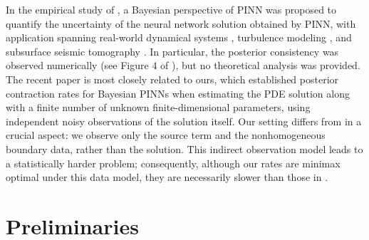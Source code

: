 \documentclass{article}
\theoremstyle{plain}
\theoremstyle{definition}
\theoremstyle{remark}
\begin{document}
In the empirical study of \cite{yang2021b}, a Bayesian perspective of PINN was proposed to quantify the uncertainty of the neural network solution obtained by PINN, with application spanning real-world dynamical systems \cite{linka2022bayesian}, turbulence modeling \cite{shukla2026uncertainty}, and subsurface seismic tomography \cite{gou2023bayesian}. In particular, the posterior consistency was observed numerically (see Figure 4 of \cite{yang2021b}), but no theoretical analysis was provided. The recent paper \cite{sun2024estimation} is  most closely related to ours, which established posterior contraction rates for Bayesian PINNs when estimating the PDE solution along with a finite number of unknown finite-dimensional parameters, using independent noisy observations of the solution itself.  Our setting differs from \cite{sun2024estimation} in a crucial aspect: we observe only the source term and the nonhomogeneous boundary data, rather than the solution. This indirect observation model leads to a statistically harder problem; consequently, although our rates are minimax optimal under this data model, they are necessarily slower than those in \cite{sun2024estimation}.

\section{Preliminaries}
\end{document}
